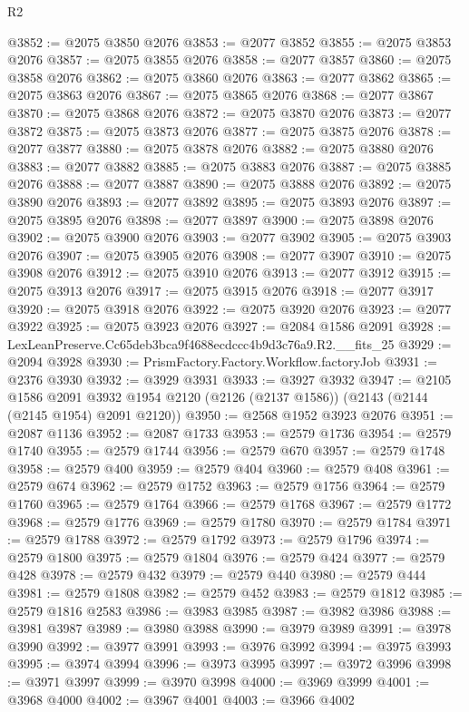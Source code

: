 \begin{lexlean}{R2}
\begin{coremodule}
@3852 := @2075 @3850 @2076
@3853 := @2077 @3852
@3855 := @2075 @3853 @2076
@3857 := @2075 @3855 @2076
@3858 := @2077 @3857
@3860 := @2075 @3858 @2076
@3862 := @2075 @3860 @2076
@3863 := @2077 @3862
@3865 := @2075 @3863 @2076
@3867 := @2075 @3865 @2076
@3868 := @2077 @3867
@3870 := @2075 @3868 @2076
@3872 := @2075 @3870 @2076
@3873 := @2077 @3872
@3875 := @2075 @3873 @2076
@3877 := @2075 @3875 @2076
@3878 := @2077 @3877
@3880 := @2075 @3878 @2076
@3882 := @2075 @3880 @2076
@3883 := @2077 @3882
@3885 := @2075 @3883 @2076
@3887 := @2075 @3885 @2076
@3888 := @2077 @3887
@3890 := @2075 @3888 @2076
@3892 := @2075 @3890 @2076
@3893 := @2077 @3892
@3895 := @2075 @3893 @2076
@3897 := @2075 @3895 @2076
@3898 := @2077 @3897
@3900 := @2075 @3898 @2076
@3902 := @2075 @3900 @2076
@3903 := @2077 @3902
@3905 := @2075 @3903 @2076
@3907 := @2075 @3905 @2076
@3908 := @2077 @3907
@3910 := @2075 @3908 @2076
@3912 := @2075 @3910 @2076
@3913 := @2077 @3912
@3915 := @2075 @3913 @2076
@3917 := @2075 @3915 @2076
@3918 := @2077 @3917
@3920 := @2075 @3918 @2076
@3922 := @2075 @3920 @2076
@3923 := @2077 @3922
@3925 := @2075 @3923 @2076
@3927 := @2084 @1586 @2091
@3928 := LexLeanPreserve.Cc65deb3bca9f4688ecdccc4b9d3c76a9.R2.__fits_25
@3929 := @2094 @3928
@3930 := PrismFactory.Factory.Workflow.factoryJob
@3931 := @2376 @3930
@3932 := @3929 @3931
@3933 := @3927 @3932
@3947 := @2105
    @1586
    @2091
    @3932
    @1954
    @2120
    (@2126 (@2137 @1586))
    (@2143 (@2144 (@2145 @1954) @2091 @2120))
@3950 := @2568 @1952 @3923 @2076
@3951 := @2087 @1136
@3952 := @2087 @1733
@3953 := @2579 @1736
@3954 := @2579 @1740
@3955 := @2579 @1744
@3956 := @2579 @670
@3957 := @2579 @1748
@3958 := @2579 @400
@3959 := @2579 @404
@3960 := @2579 @408
@3961 := @2579 @674
@3962 := @2579 @1752
@3963 := @2579 @1756
@3964 := @2579 @1760
@3965 := @2579 @1764
@3966 := @2579 @1768
@3967 := @2579 @1772
@3968 := @2579 @1776
@3969 := @2579 @1780
@3970 := @2579 @1784
@3971 := @2579 @1788
@3972 := @2579 @1792
@3973 := @2579 @1796
@3974 := @2579 @1800
@3975 := @2579 @1804
@3976 := @2579 @424
@3977 := @2579 @428
@3978 := @2579 @432
@3979 := @2579 @440
@3980 := @2579 @444
@3981 := @2579 @1808
@3982 := @2579 @452
@3983 := @2579 @1812
@3985 := @2579 @1816 @2583
@3986 := @3983 @3985
@3987 := @3982 @3986
@3988 := @3981 @3987
@3989 := @3980 @3988
@3990 := @3979 @3989
@3991 := @3978 @3990
@3992 := @3977 @3991
@3993 := @3976 @3992
@3994 := @3975 @3993
@3995 := @3974 @3994
@3996 := @3973 @3995
@3997 := @3972 @3996
@3998 := @3971 @3997
@3999 := @3970 @3998
@4000 := @3969 @3999
@4001 := @3968 @4000
@4002 := @3967 @4001
@4003 := @3966 @4002

\end{coremodule}
\end{lexlean}
